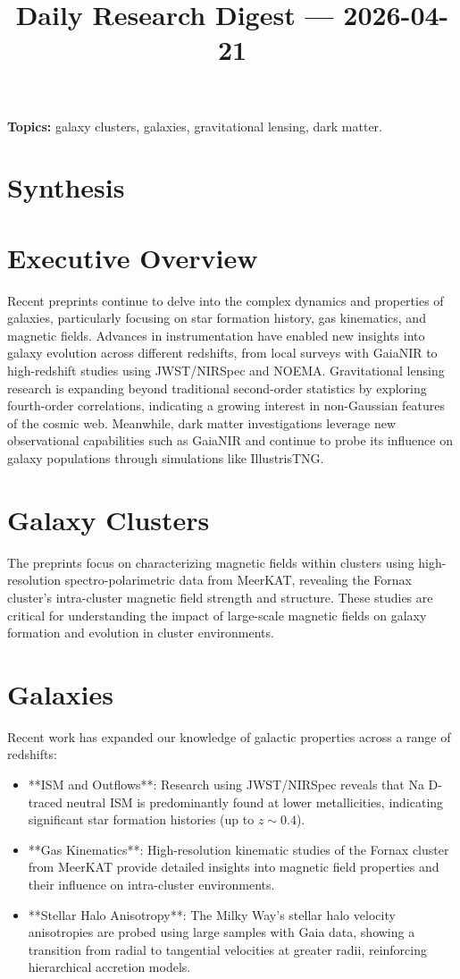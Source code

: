 \documentclass[11pt]{article}
\begin{document}
\title{Daily Research Digest --- 2026-04-21}
\author{}
\date{}
\maketitle
\textbf{Topics:} galaxy clusters, galaxies, gravitational lensing, dark matter.
\section*{Synthesis}
\section*{Executive Overview}
Recent preprints continue to delve into the complex dynamics and properties of galaxies, particularly focusing on star formation history, gas kinematics, and magnetic fields. Advances in instrumentation have enabled new insights into galaxy evolution across different redshifts, from local surveys with GaiaNIR to high-redshift studies using JWST/NIRSpec and NOEMA. Gravitational lensing research is expanding beyond traditional second-order statistics by exploring fourth-order correlations, indicating a growing interest in non-Gaussian features of the cosmic web. Meanwhile, dark matter investigations leverage new observational capabilities such as GaiaNIR and continue to probe its influence on galaxy populations through simulations like IllustrisTNG.
\section*{Galaxy Clusters}
The preprints focus on characterizing magnetic fields within clusters using high-resolution spectro-polarimetric data from MeerKAT, revealing the Fornax cluster's intra-cluster magnetic field strength and structure. These studies are critical for understanding the impact of large-scale magnetic fields on galaxy formation and evolution in cluster environments.
\section*{Galaxies}
Recent work has expanded our knowledge of galactic properties across a range of redshifts:
\begin{itemize}
\item **ISM and Outflows**: Research using JWST/NIRSpec reveals that Na D-traced neutral ISM is predominantly found at lower metallicities, indicating significant star formation histories (up to \(z \sim 0.4\)).
\item **Gas Kinematics**: High-resolution kinematic studies of the Fornax cluster from MeerKAT provide detailed insights into magnetic field properties and their influence on intra-cluster environments.
\item **Stellar Halo Anisotropy**: The Milky Way's stellar halo velocity anisotropies are probed using large samples with Gaia data, showing a transition from radial to tangential velocities at greater radii, reinforcing hierarchical accretion models.
\end{itemize}
\end{document}
